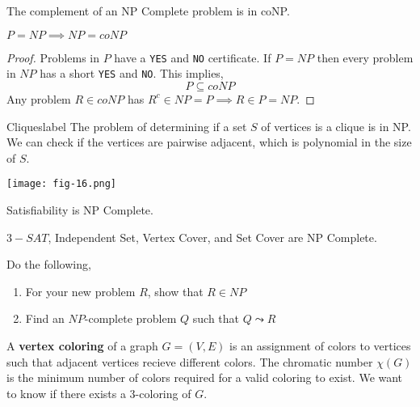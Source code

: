  	\begin{rmk}
 		The complement of an NP Complete problem is in coNP.
 	\end{rmk}

 	\begin{rmk}
 		$P = NP \implies NP = coNP$
 	\end{rmk}

 	\begin{proof}
 		Problems in $P$ have a \texttt{YES} and \texttt{NO} certificate. If $P = NP$ then every problem in $NP$ has a short \texttt{YES} and \texttt{NO}. This implies,
 		\[P \subseteq coNP\]
 		\noindent Any problem $R \in coNP$ has $R^c \in NP = P \implies R \in P = NP$.
 	\end{proof}

 	\begin{ex}{Cliques}{label}
 		The problem of determining if a set $S$ of vertices is a clique is in NP. We can check if the vertices are pairwise adjacent, which is polynomial in the size of $S$.
 	\end{ex}

 	\begin{marginfigure}
 		\begin{center}
 						\texttt{[image: fig-16.png]}
 			\end{center}
 	\end{marginfigure}

 	\begin{defn}
 		Satisfiability is NP Complete.
 	\end{defn}

 	\begin{marginfigure}
 		$3-SAT$, Independent Set, Vertex Cover, and Set Cover are NP Complete.
 	\end{marginfigure}

 	\begin{rmk}
 		Do the following,
 		\begin{enumerate}
 			\item For your new problem $R$, show that $R \in NP$
 			\item Find an $NP$-complete problem $Q$ such that $Q \leadsto R$
 		\end{enumerate}
 	\end{rmk}

 	\begin{defn}
 		A \textbf{vertex coloring} of a graph $G = (V,E)$ is an assignment of colors to vertices such that adjacent vertices recieve different colors. The chromatic number $\chi(G)$ is the minimum number of colors required for a valid coloring to exist. We want to know if there exists a 3-coloring of $G$.
 	\end{defn}

